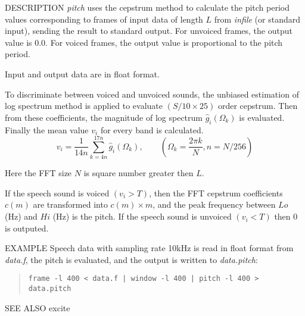 \begin{qsection}{DESCRIPTION}
{\em pitch} uses the cepstrum method to calculate the pitch period values
corresponding to frames of input data of length $L$ 
from {\em infile} (or standard input), 
sending the result to standard output. 
For unvoiced frames, the output value is 0.0. 
For voiced frames, the output value is proportional to the pitch period.

Input and output data are in float format.

To discriminate between voiced and unvoiced sounds,
the unbiased estimation of log spectrum method is applied
to evaluate $(S/10 \times 25)$ order cepstrum.
Then from these coefficients, the magnitude of log spectrum
$\hat{g}_i(\Omega_k)$ is evaluated.
Finally the mean value $v_i$ for every band is calculated.
\begin{displaymath}
v_i = \frac{1}{14 n}\sum_{k = 4 n}^{17 n}\hat{g}_i(\Omega_k),\qquad (\Omega_k = \frac{2 \pi k}{N},n = N /256)
\end{displaymath}

Here the FFT size $N$ is square number greater then $L$.

If the speech sound is voiced $(v_i > T)$,
then the FFT cepstrum coefficients $c(m)$ are transformed
into $c(m) \times m$,
and the peak frequency between $Lo$ (Hz) and $Hi$ (Hz)
is the pitch.
If the speech sound is unvoiced $(v_i < T)$
then $0$ is outputed.

\end{qsection}

\begin{options}
\end{options}

\begin{qsection}{EXAMPLE}
Speech data with sampling rate 10kHz is read in float format
from {\em data.f}, the pitch is evaluated, and
the output is written to {\em data.pitch}:
\begin{quote}
  \verb!frame -l 400 < data.f | window -l 400 | pitch -l 400 > data.pitch !
\end{quote}
\end{qsection}

\begin{qsection}{SEE ALSO}
  excite
\end{qsection}
